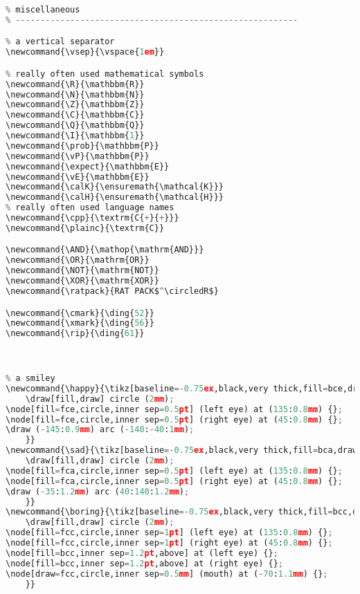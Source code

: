 {\begin{lstlisting}[language=Python,style=normal,escapechar=?,morekeywords={True, False}, mathescape]
% ---------------------------------------------------------
% miscellaneous
% ---------------------------------------------------------

% a vertical separator
\newcommand{\vsep}{\vspace{1em}}

% really often used mathematical symbols
\newcommand{\R}{\mathbbm{R}}
\newcommand{\N}{\mathbbm{N}}
\newcommand{\Z}{\mathbbm{Z}}
\newcommand{\C}{\mathbbm{C}}
\newcommand{\Q}{\mathbbm{Q}}
\newcommand{\I}{\mathbbm{1}}
\newcommand{\prob}{\mathbbm{P}}
\newcommand{\vP}{\mathbbm{P}}
\newcommand{\expect}{\mathbbm{E}}
\newcommand{\vE}{\mathbbm{E}}
\newcommand{\calK}{\ensuremath{\mathcal{K}}}
\newcommand{\calH}{\ensuremath{\mathcal{H}}}
% really often used language names
\newcommand{\cpp}{\textrm{C{+}{+}}}
\newcommand{\plainc}{\textrm{C}}

\newcommand{\AND}{\mathop{\mathrm{AND}}}
\newcommand{\OR}{\mathrm{OR}}
\newcommand{\NOT}{\mathrm{NOT}}
\newcommand{\XOR}{\mathrm{XOR}}
\newcommand{\ratpack}{RAT PACK$^\circledR$}

\newcommand{\cmark}{\ding{52}}
\newcommand{\xmark}{\ding{56}}
\newcommand{\rip}{\ding{61}}



% a smiley
\newcommand{\happy}{\tikz[baseline=-0.75ex,black,very thick,fill=bce,draw=fce,scale=1.2]{
    \draw[fill,draw] circle (2mm);
\node[fill=fce,circle,inner sep=0.5pt] (left eye) at (135:0.8mm) {};
\node[fill=fce,circle,inner sep=0.5pt] (right eye) at (45:0.8mm) {};
\draw (-145:0.9mm) arc (-140:-40:1mm);
    }}
\newcommand{\sad}{\tikz[baseline=-0.75ex,black,very thick,fill=bca,draw=fca,scale=1.2]{
    \draw[fill,draw] circle (2mm);
\node[fill=fca,circle,inner sep=0.5pt] (left eye) at (135:0.8mm) {};
\node[fill=fca,circle,inner sep=0.5pt] (right eye) at (45:0.8mm) {};
\draw (-35:1.2mm) arc (40:140:1.2mm);
    }}
\newcommand{\boring}{\tikz[baseline=-0.75ex,black,very thick,fill=bcc,draw=fcc,scale=1.2]{
    \draw[fill,draw] circle (2mm);
\node[fill=fcc,circle,inner sep=1pt] (left eye) at (135:0.8mm) {};
\node[fill=fcc,circle,inner sep=1pt] (right eye) at (45:0.8mm) {};
\node[fill=bcc,inner sep=1.2pt,above] at (left eye) {};
\node[fill=bcc,inner sep=1.2pt,above] at (right eye) {};
\node[draw=fcc,circle,inner sep=0.5mm] (mouth) at (-70:1.1mm) {};
    }}




\end{lstlisting}}
